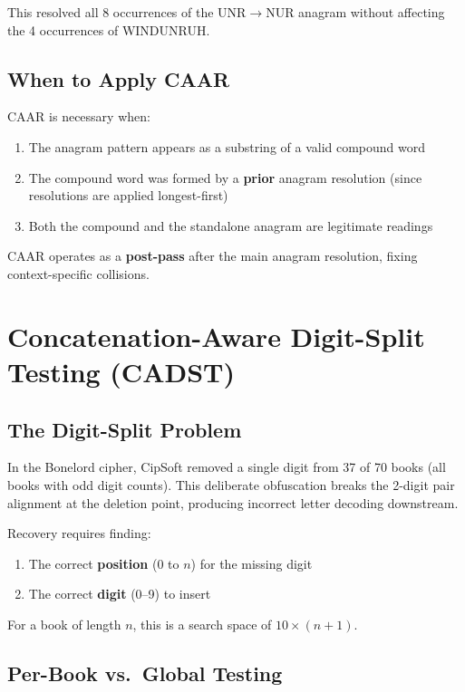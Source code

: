 \documentclass[11pt,a4paper]{article}
\begin{document}
This resolved all 8 occurrences of the UNR$\rightarrow$NUR anagram without affecting the 4 occurrences of WINDUNRUH.

\subsection{When to Apply CAAR}

CAAR is necessary when:
\begin{enumerate}
\item The anagram pattern appears as a substring of a valid compound word
\item The compound word was formed by a \textbf{prior} anagram resolution (since resolutions are applied longest-first)
\item Both the compound and the standalone anagram are legitimate readings
\end{enumerate}

CAAR operates as a \textbf{post-pass} after the main anagram resolution, fixing context-specific collisions.

\section{Concatenation-Aware Digit-Split Testing (CADST)}

\subsection{The Digit-Split Problem}

In the Bonelord cipher, CipSoft removed a single digit from 37 of 70 books (all books with odd digit counts). This deliberate obfuscation breaks the 2-digit pair alignment at the deletion point, producing incorrect letter decoding downstream.

Recovery requires finding:
\begin{enumerate}
\item The correct \textbf{position} (0 to $n$) for the missing digit
\item The correct \textbf{digit} (0--9) to insert
\end{enumerate}

For a book of length $n$, this is a search space of $10 \times (n+1)$.

\subsection{Per-Book vs.\ Global Testing}
\end{document}
